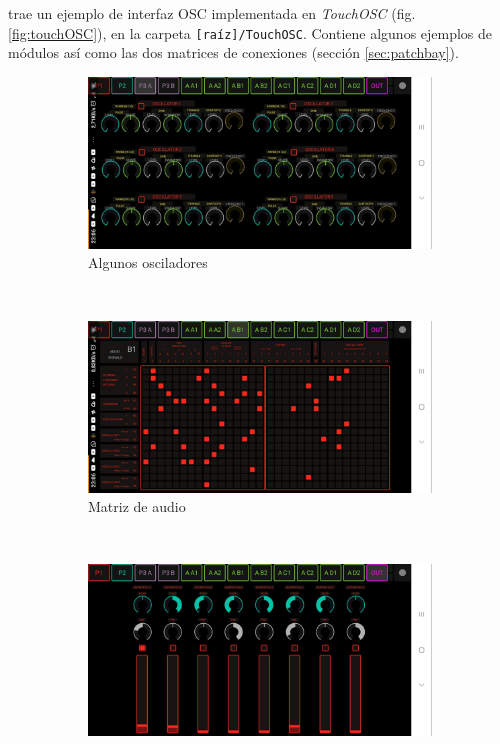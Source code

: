 \appName trae un ejemplo de interfaz OSC implementada en \textit{TouchOSC} (fig. \ref{fig:touchOSC}), en la carpeta \texttt{[raíz]/TouchOSC}. Contiene algunos ejemplos de módulos así como las dos matrices de conexiones (sección \ref{sec:patchbay}).

\begin{figure}
	\centering
	\begin{subfigure}[b]{0.3\textwidth}
		\includegraphics[width=\textwidth]{images/touchOSC_oscillators}
		\caption{Algunos osciladores}
		\label{fig:touchOSC_oscillators}
	\end{subfigure}
	~ %
	\begin{subfigure}[b]{0.3\textwidth}
		\includegraphics[width=\textwidth]{images/touchOSC_matriz}
		\caption{Matriz de audio}
		\label{fig:touchOSC_matriz}
	\end{subfigure}
	~ %
	\begin{subfigure}[b]{0.3\textwidth}
		\includegraphics[width=\textwidth]{images/touchOSC_channels}

\end{subfigure}
\end{figure}
